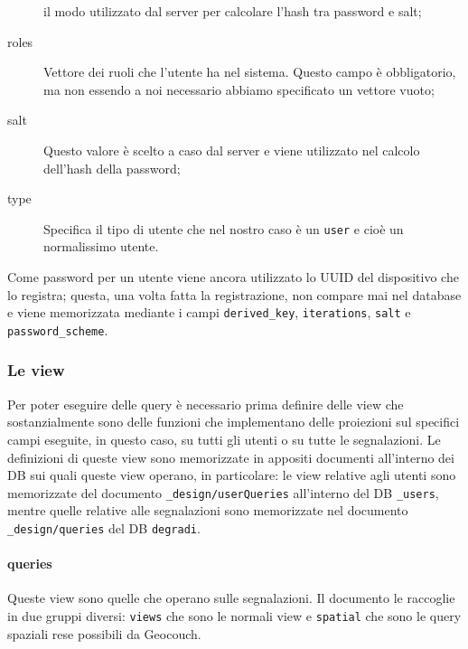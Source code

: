 \begin{description}
                    il modo utilizzato dal server per calcolare l'hash tra
                    password e salt;
                    \item[roles] Vettore dei ruoli che l'utente ha nel
                    sistema. Questo campo è obbligatorio, ma non essendo a noi
                    necessario abbiamo specificato un vettore vuoto;
                    \item[salt] Questo valore è scelto a caso dal server e
                    viene utilizzato nel calcolo dell'hash della password;
                    \item[type] Specifica il tipo di utente che nel nostro
                    caso è un \texttt{user} e cioè un normalissimo utente.
                \end{description}
                Come password per un utente viene ancora utilizzato lo UUID
                del dispositivo che lo registra; questa, una volta fatta la
                registrazione, non compare mai nel database e viene
                memorizzata mediante i campi \texttt{derived\_key},
                \texttt{iterations}, \texttt{salt} e \texttt{password\_scheme}.

            \subsubsection{Le view}
                Per poter eseguire delle query è necessario prima definire
                delle view che sostanzialmente sono delle funzioni che
                implementano delle proiezioni sul specifici campi eseguite, in
                questo caso, su tutti gli utenti o su tutte le segnalazioni.
                Le definizioni di queste view sono memorizzate in appositi
                documenti all'interno dei DB sui quali queste view operano, in
                particolare: le view relative agli utenti sono memorizzate del
                documento \texttt{\_design/userQueries} all'interno del DB
                \texttt{\_users}, mentre quelle relative alle segnalazioni
                sono memorizzate nel documento \texttt{\_design/queries} del
                DB \texttt{degradi}.

                \paragraph{queries} Queste view sono quelle che operano sulle
                segnalazioni. Il documento le raccoglie in due gruppi diversi:
                \texttt{views} che sono le normali view e \texttt{spatial} che
                sono le query spaziali rese possibili da Geocouch.

